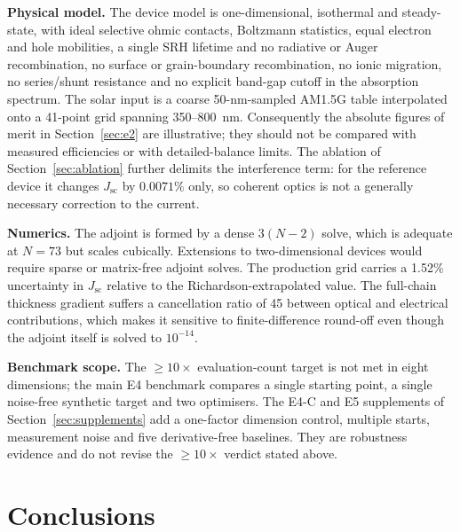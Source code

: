 \documentclass[preprint,12pt]{elsarticle}
\begin{document}
\textbf{Physical model.} The device model is one-dimensional, isothermal and
steady-state, with ideal selective ohmic contacts, Boltzmann statistics,
equal electron and hole mobilities, a single SRH lifetime and no radiative or
Auger recombination, no surface or grain-boundary recombination, no ionic
migration, no series/shunt resistance and no explicit band-gap cutoff in the
absorption spectrum. The solar input is a coarse 50-nm-sampled AM1.5G table
interpolated onto a 41-point grid spanning 350--800~nm. Consequently the
absolute figures of merit in
Section~\ref{sec:e2} are illustrative; they should not be compared with
measured efficiencies or with detailed-balance limits. The ablation of
Section~\ref{sec:ablation} further delimits the interference term: for
the reference device it changes $J_{\mathrm{sc}}$ by $0.0071\%$ only,
so coherent optics is not a generally necessary correction to the
current.

\textbf{Numerics.} The adjoint is formed by a dense $3(N-2)$ solve, which is
adequate at $N=73$ but scales cubically. Extensions to two-dimensional
devices would require sparse or matrix-free adjoint solves. The production
grid carries a 1.52\% uncertainty in $J_{\mathrm{sc}}$ relative to the
Richardson-extrapolated value. The full-chain thickness gradient suffers a
cancellation ratio of 45 between optical and electrical contributions, which
makes it sensitive to finite-difference round-off even though the adjoint
itself is solved to $10^{-14}$.

\textbf{Benchmark scope.} The $\ge10\times$ evaluation-count target is not
met in eight dimensions; the main E4 benchmark compares a single starting point,
a single noise-free synthetic target and two optimisers. The E4-C and E5 supplements of Section~\ref{sec:supplements} add a one-factor dimension control, multiple starts, measurement noise and five derivative-free baselines. They are robustness evidence and do not revise the $\ge10\times$ verdict stated above.

\section{Conclusions}
\label{sec:conclusions}
\end{document}
